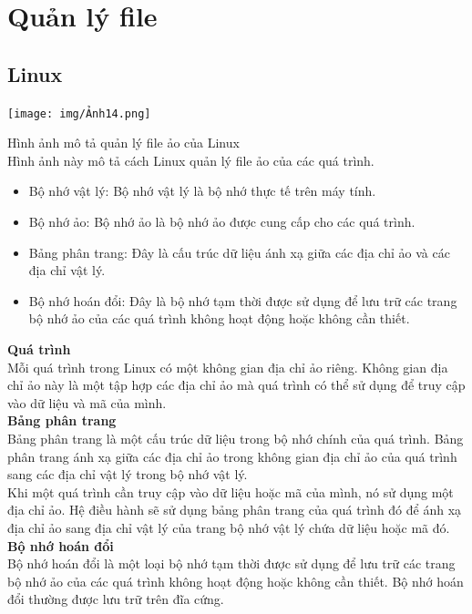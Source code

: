 \documentclass[12pt,a4paper]{article}
\begin{document}
\section{Quản lý file}
\subsection{Linux}
\begin{center}
	\texttt{[image: img/Ảnh14.png]}
\end{center}
Hình ảnh mô tả quản lý file ảo của Linux\\

Hình ảnh này mô tả cách Linux quản lý file ảo của các quá trình.

\begin{itemize}
	\item Bộ nhớ vật lý: Bộ nhớ vật lý là bộ nhớ thực tế trên máy tính.
	\item Bộ nhớ ảo: Bộ nhớ ảo là bộ nhớ ảo được cung cấp cho các quá trình.
	\item Bảng phân trang: Đây là cấu trúc dữ liệu ánh xạ giữa các địa chỉ ảo và các địa chỉ vật lý.
	\item Bộ nhớ hoán đổi: Đây là bộ nhớ tạm thời được sử dụng để lưu trữ các trang bộ nhớ ảo của các quá trình không hoạt động hoặc không cần thiết.
\end{itemize}
\textbf{Quá trình}\\

Mỗi quá trình trong Linux có một không gian địa chỉ ảo riêng. Không gian địa chỉ ảo này là một tập hợp các địa chỉ ảo mà quá trình có thể sử dụng để truy cập vào dữ liệu và mã của mình.\\

\textbf{Bảng phân trang}\\

Bảng phân trang là một cấu trúc dữ liệu trong bộ nhớ chính của quá trình. Bảng phân trang ánh xạ giữa các địa chỉ ảo trong không gian địa chỉ ảo của quá trình sang các địa chỉ vật lý trong bộ nhớ vật lý.\\

Khi một quá trình cần truy cập vào dữ liệu hoặc mã của mình, nó sử dụng một địa chỉ ảo. Hệ điều hành sẽ sử dụng bảng phân trang của quá trình đó để ánh xạ địa chỉ ảo sang địa chỉ vật lý của trang bộ nhớ vật lý chứa dữ liệu hoặc mã đó.\\

\textbf{Bộ nhớ hoán đổi}\\

Bộ nhớ hoán đổi là một loại bộ nhớ tạm thời được sử dụng để lưu trữ các trang bộ nhớ ảo của các quá trình không hoạt động hoặc không cần thiết. Bộ nhớ hoán đổi thường được lưu trữ trên đĩa cứng.\\
\end{document}
